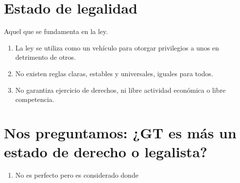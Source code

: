 \section{Estado de legalidad}
Aquel que se fundamenta en la ley.
\begin{enumerate}
    \item La ley se utiliza como un vehículo para otorgar privilegios a unos en detrimento de otros.  
    \item No existen reglas claras, estables y universales, iguales para todos. 
    \item No garantiza ejercicio de derechos, ni libre actividad económica o libre competencia.
\end{enumerate}

\section{\textbf{Nos preguntamos:} ¿GT es más un estado de derecho o legalista?}
\begin{enumerate}
    \item No es perfecto pero es considerado donde 
\end{enumerate}
